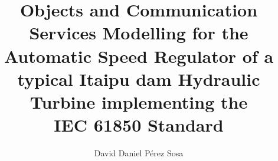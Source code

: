 %
%
%
%
%
%
% 
% 



\title{Objects and Communication Services Modelling for the Automatic Speed 
Regulator of a typical Itaipu dam Hydraulic Turbine implementing the \\IEC
61850 Standard}


\author{David Daniel P\'erez Sosa}

